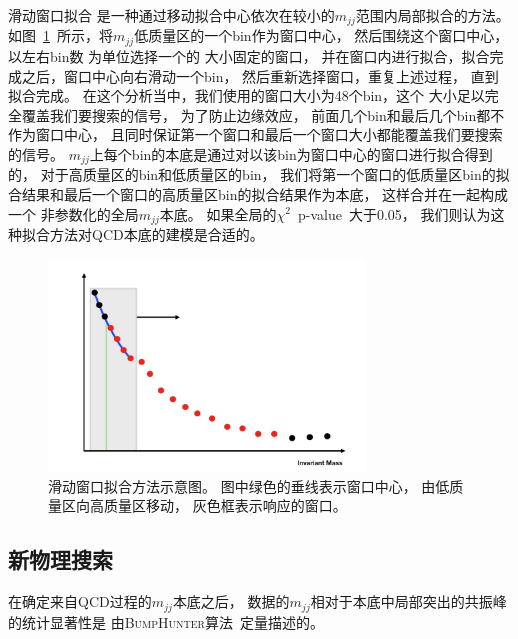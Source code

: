 滑动窗口拟合
是一种通过移动拟合中心依次在较小的$m_{jj}$范围内局部拟合的方法。
如图~\ref{fig:Mjj1}~所示，将$m_{jj}$低质量区的一个bin作为窗口中心，
然后围绕这个窗口中心，以左右bin数
为单位选择一个的
大小固定的窗口，
并在窗口内进行拟合，拟合完成之后，窗口中心向右滑动一个bin，
然后重新选择窗口，重复上述过程，
直到拟合完成。
在这个分析当中，我们使用的窗口大小为48个bin，这个
大小足以完全覆盖我们要搜索的信号，
为了防止边缘效应，
前面几个bin和最后几个bin都不作为窗口中心，
且同时保证第一个窗口和最后一个窗口大小都能覆盖我们要搜索的信号。
$m_{jj}$上每个bin的本底是通过对以该bin为窗口中心的窗口进行拟合得到的，
对于高质量区的bin和低质量区的bin，
我们将第一个窗口的低质量区bin的拟合结果和最后一个窗口的高质量区bin的拟合结果作为本底，
这样合并在一起构成
一个
非参数化的全局$m_{jj}$本底。
如果全局的$\chi^2$~p-value~\cite{CHI2}大于0.05，
我们则认为这种拟合方法对QCD本底的建模是合适的。

\begin{figure}[thbp]
  \centering
  \includegraphics[width=0.75\textwidth]{figuresDijet/Mjj1.jpg}
  \caption{ 滑动窗口拟合方法示意图。
  图中绿色的垂线表示窗口中心，
  由低质量区向高质量区移动，
  灰色框表示响应的窗口。  }
  \label{fig:Mjj1}
\end{figure}


\subsection{新物理搜索}
\label{sec:DijetMjj2}


在确定来自QCD过程的$m_{jj}$本底之后，
数据的$m_{jj}$相对于本底中局部突出的共振峰的统计显著性是
由\textsc{BumpHunter}算法~\cite{Aaltonen:2008vt,Choudalakis:2011bh}定量描述的。

